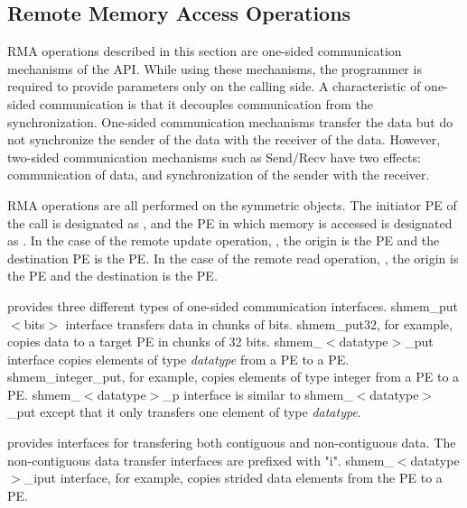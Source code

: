 \subsection{Remote Memory Access Operations}
\label{sec:rma}
\ac{RMA} operations described in this section are one-sided communication
mechanisms of the \openshmem{} \ac{API}. While 
using these mechanisms, the programmer is required to provide parameters
only on the calling side. A characteristic of one-sided communication 
is that it decouples communication from
the synchronization. One-sided communication mechanisms transfer 
the data but do not synchronize the sender of the data with the receiver
of the data. However, two-sided communication mechanisms such as Send/Recv have two effects: 
communication of data, and synchronization of the sender with the receiver.

\openshmem{} \ac{RMA} operations are all performed on the symmetric objects. 
The initiator \ac{PE} of the call is designated as \source{}, and the 
\ac{PE} in which memory is accessed is designated as \target{}. In the case of the remote
update operation, \PUT{}, the origin is the \source{} \ac{PE} and the 
destination \ac{PE} is the \target{} PE. In the case of the remote read operation, \GET{}, 
the origin is the \target{} \ac{PE} and the destination is the \source{} \ac{PE}.

\openshmem{} provides three different types of one-sided communication interfaces. 
shmem\_put$<$bits$>$ interface transfers data in chunks 
of bits. shmem\_put32, for example, copies data to a target \ac{PE} in chunks of 
32 bits. shmem\_$<$datatype$>$\_put interface copies elements of type 
\textit{datatype} from a \source{} \ac{PE} to a \target{} \ac{PE}. 
shmem\_integer\_put, for example, copies elements
of type integer from a \source{} \ac{PE} to a \target{} \ac{PE}. 
shmem\_$<$datatype$>$\_p interface is similar to shmem\_$<$datatype$>$\_put 
except that it only transfers one element of type \textit{datatype}.

\openshmem{} provides interfaces for transfering both contiguous and 
non-contiguous data. The non-contiguous data transfer interfaces are prefixed 
with "i". shmem\_$<$datatype$>$\_iput interface, for example, copies strided
data elements from the \source{} \ac{PE} to a \target{} \ac{PE}. 


